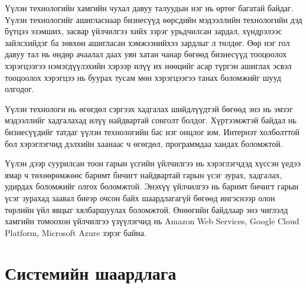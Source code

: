 Үүлэн технологийн хамгийн чухал давуу талуудын нэг нь өртөг багатай байдаг. Үүлэн технологийг ашигласнаар бизнесүүд өөрсдийн мэдээллийн технологийн дэд бүтцээ эзэмших, засвар үйлчилгээ хийх зэрэг урьдчилсан зардал, хүндрэлээс зайлсхийдэг ба зөвхөн ашигласан хэмжээнийхээ зардлыг л төлдөг. Өөр нэг гол давуу тал нь өндөр ачаалал даах уян хатан чанар бөгөөд бизнесүүд тооцоолох хэрэгцээгээ нэмэгдүүлэхийн хэрээр илүү их нөөцийг асар түргэн ашиглах эсвэл тооцоолох хэрэгцээ нь буурах тусам мөн хэрэгцээгээ танах боломжийг шууд олгодог.

Үүлэн технологи нь өгөгдөл сэргээх хадгалах шийдлүүдтэй бөгөөд энэ нь эмзэг мэдээллийг хадгалахад илүү найдвартай сонголт болдог. Хүртээмжтэй байдал нь бизнесүүдийг татдаг үүлэн технологийн бас нэг онцлог юм. Интернэт холболттой бол хэрэглэгчид дэлхийн хаанаас ч өгөгдөл, программдаа хандах боломжтой.

Үүлэн дээр суурилсан тоон гарын үсгийн үйлчилгээ нь хэрэглэгчдэд хүссэн үедээ ямар ч төхөөрөмжөөс баримт бичигт найдвартай гарын үсэг зурах, хадгалах, удирдах боломжийг олгох боломжтой. Энэхүү үйлчилгээ нь баримт бичигт гарын үсэг зурахад заавал биеэр очсон байх шаардлагагүй бөгөөд ингэснээр олон төрлийн үйл явцыг хялбаршуулах боломжтой. Өнөөгийн байдлаар энэ чиглэлд хамгийн томоохон үйлчилгээ үзүүлэгчид нь Amazon Web Services, Google Cloud Platform, Microsoft Azure зэрэг байна.

\pagebreak
\section{Системийн шаардлага}
